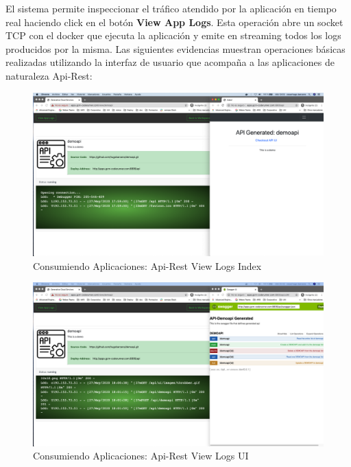 \documentclass[a4paper,11pt]{book}
\begin{document}
El sistema permite inspeccionar el tráfico atendido por la aplicación en tiempo real haciendo click en el botón \textbf{View App Logs}. Esta operación abre un socket TCP con el docker que ejecuta la aplicación y emite en streaming todos los logs producidos por la misma. Las siguientes evidencias muestran operaciones básicas realizadas utilizando la interfaz de usuario que acompaña a las aplicaciones de naturaleza Api-Rest:

\begin{figure}[H]
\centering
\includegraphics[scale=0.2]{imagenes/casouso/1_7.png}
\caption{  Consumiendo Aplicaciones: Api-Rest View Logs Index }
\end{figure}


\begin{figure}[H]
\centering
\includegraphics[scale=0.2]{imagenes/casouso/1_8.png}
\caption{  Consumiendo Aplicaciones: Api-Rest View Logs UI }
\end{figure}
\end{document}
